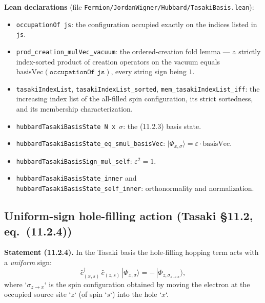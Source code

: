 \documentclass[a4paper,11pt]{article}
\begin{document}
\medskip
\noindent\textbf{Lean declarations}
(file \texttt{Fermion/JordanWigner/Hubbard/TasakiBasis.lean}):
\begin{itemize}
  \item \texttt{occupationOf js}: the configuration occupied exactly on the
    indices listed in \texttt{js}.
  \item \texttt{prod\_creation\_mulVec\_vacuum}: the ordered-creation fold
    lemma --- a strictly index-sorted product of creation operators on the
    vacuum equals \(\mathrm{basisVec}(\texttt{occupationOf js})\), every string
    sign being \(1\).
  \item \texttt{tasakiIndexList}, \texttt{tasakiIndexList\_sorted},
    \texttt{mem\_tasakiIndexList\_iff}: the increasing index list of the
    all-filled spin configuration, its strict sortedness, and its membership
    characterization.
  \item \texttt{hubbardTasakiBasisState N x }\(\sigma\): the (11.2.3) basis
    state.
  \item \texttt{hubbardTasakiBasisState\_eq\_smul\_basisVec}:
    \(|\Phi_{x,\sigma}\rangle = \varepsilon\cdot\mathrm{basisVec}\).
  \item \texttt{hubbardTasakiBasisSign\_mul\_self}: \(\varepsilon^2 = 1\).
  \item \texttt{hubbardTasakiBasisState\_inner} and
    \texttt{hubbardTasakiBasisState\_self\_inner}: orthonormality and
    normalization.
\end{itemize}

\subsection{Uniform-sign hole-filling action (Tasaki §11.2, eq.~(11.2.4))}
\label{subsec:hubbard-tasaki-hop}

\noindent\textbf{Statement (11.2.4).}
In the Tasaki basis the hole-filling hopping term acts with a \emph{uniform}
sign:
\[
  \hat c^\dagger_{(x,s)}\,\hat c_{(z,s)}\,|\Phi_{x,\sigma}\rangle
    = -\,|\Phi_{z,\sigma_{z\to x}}\rangle,
\]
where `\(\sigma_{z\to x}\)` is the spin configuration obtained by moving the
electron at the occupied source site `\(z\)` (of spin `\(s\)`) into the hole
`\(x\)`.
\end{document}
